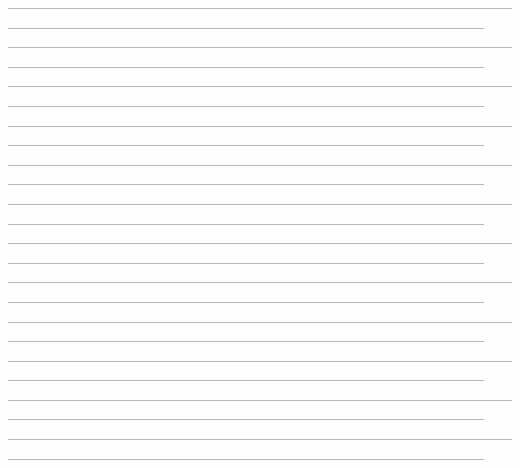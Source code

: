 \documentclass{article}
\theoremstyle{definition}
\begin{document}
------------------------------------------------------------------------------------------------------------------------------------------------------------------------------------------------------------------
------------------------------------------------------------------------------------------------------------------------------------------------------------------------------------------------------------------
------------------------------------------------------------------------------------------------------------------------------------------------------------------------------------------------------------------
------------------------------------------------------------------------------------------------------------------------------------------------------------------------------------------------------------------
------------------------------------------------------------------------------------------------------------------------------------------------------------------------------------------------------------------
------------------------------------------------------------------------------------------------------------------------------------------------------------------------------------------------------------------
------------------------------------------------------------------------------------------------------------------------------------------------------------------------------------------------------------------
------------------------------------------------------------------------------------------------------------------------------------------------------------------------------------------------------------------
------------------------------------------------------------------------------------------------------------------------------------------------------------------------------------------------------------------
------------------------------------------------------------------------------------------------------------------------------------------------------------------------------------------------------------------
------------------------------------------------------------------------------------------------------------------------------------------------------------------------------------------------------------------
------------------------------------------------------------------------------------------------------------------------------------------------------------------------------------------------------------------

\fi
\end{document}
